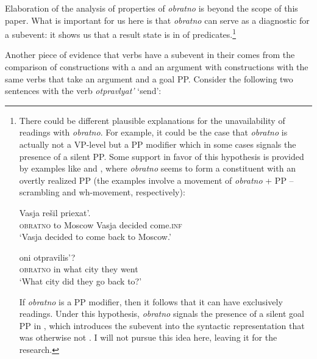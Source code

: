 \documentclass[output=paper]{langscibook}
\begin{document}
\noindent Elaboration of the analysis of properties of  \textit{obratno} is beyond the scope of this paper. What is important for us here is that \textit{obratno} can serve as a diagnostic for a  subevent: it shows us that a result state is  in  of  predicates.\footnote{There
  could be different plausible explanations for the unavailability of  readings with \textit{obratno}. For example, it could be the case that \textit{obratno} is actually not a VP-level  but a PP modifier which in some cases signals the presence of a silent PP. Some support in favor of this hypothesis is provided by examples like  and , where \textit{obratno} seems to form a constituent with an overtly realized PP (the examples involve a movement of \textit{obratno} + PP -- scrambling and wh-movement, respectively):

  \ea\label{ex:bondarenko:fn9i}
   Vasja rešil priexat’.\\
  {} \textsc{obratno} to Moscow Vasja decided come.\textsc{inf}\\
  \glt `Vasja decided to come back to Moscow.'
  \z

  \ea\label{ex:bondarenko:fn9ii}
     oni otpravilis’?\\
    {} \textsc{obratno} in what city they went\\
    \glt `What city did they go back to?'
    \z
    
    \noindent If \textit{obratno} is a PP modifier, then it follows that it can have exclusively  readings. Under this hypothesis, \textit{obratno} signals the presence of a silent goal PP in , which introduces the  subevent into the syntactic representation that was otherwise not . I will not pursue this idea here, leaving it for the  research.
    }

Another piece of evidence that   verbs have a  sub\-event in their  comes from the comparison of  constructions with a  and an  argument with constructions with the same verbs that take an  argument and a goal PP. Consider the following two sentences with the verb \textit{otpravlyat’} ‘send’:
\end{document}
